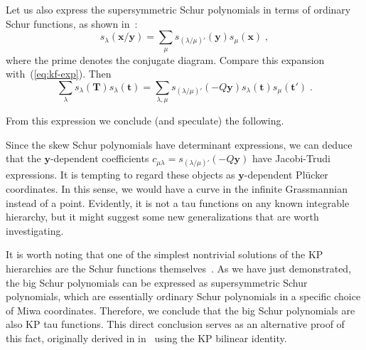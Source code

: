 \documentclass[a4paper,11pt]{amsart}
\begin{document}
Let us also express the supersymmetric Schur polynomials in terms of
ordinary Schur functions, as shown in~\cite[Sec. I.5, exerc. 23]{Macdonald:1998}:
\begin{equation}
  s_{\lambda}(\bm{x}/\bm{y}) = \sum_\mu s_{(\lambda/\mu)'}(\bm{y}) s_\mu(\bm{x})\; ,
\end{equation}
where the prime denotes the conjugate diagram. Compare this expansion
with~(\ref{eq:kf-exp}). Then
\begin{equation}
  \label{eq:tau-hl}
  \sum_{\lambda } s_\lambda(\bm{T}) s_\lambda(\bm{t}) =
  \sum_{\lambda,\mu } s_{(\lambda/\mu)'}(- Q\bm{y}) s_\lambda(\bm{t}) s_\mu(\bm{t}')\; .
\end{equation}

From this expression we conclude (and speculate) the following. 

\begin{remark}
Since the skew Schur polynomials have determinant expressions, we can
deduce that the \(\bm{y}\)-dependent coefficients \(c_{\mu \lambda} =
s_{(\lambda/\mu)'}(-Q\bm{y})\) have Jacobi-Trudi expressions.  It is
tempting to regard these objects as \(\bm{y}\)-dependent Plücker
coordinates.  In this sense, we would have a curve in the infinite
Grassmannian instead of a point. Evidently, it is not a tau functions
on any known integrable hierarchy, but it might suggest some new
generalizations that are worth investigating.
\end{remark}

\begin{remark}
It is worth noting that one of the simplest nontrivial solutions of
the KP hierarchies are the Schur functions
themselves~\emph{\cite{Zabrodin2018}}. As we have just demonstrated, the big
Schur polynomials can be expressed as supersymmetric Schur
polynomials, which are essentially ordinary Schur polynomials in a
specific choice of Miwa coordinates. Therefore, we conclude that the
big Schur polynomials are also KP tau functions. This direct
conclusion serves as an alternative proof of this fact, originally derived in
in~\emph{\cite{Necoechea:2019wbg}} using the KP bilinear identity.
\end{remark}
\end{document}
